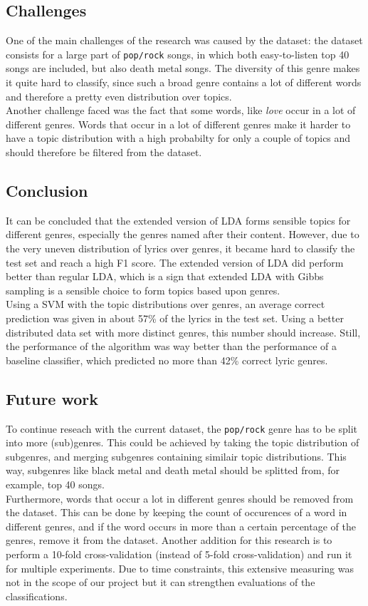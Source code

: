 \subsection{Challenges}
One of the main challenges of the research was caused by the dataset: the dataset consists for a large part of \verb|pop/rock| songs, in which both easy-to-listen top 40 songs are included, but also death metal songs. The diversity of this genre makes it quite hard to classify, since such a broad genre contains a lot of different words and therefore a pretty even distribution over topics. \\
Another challenge faced was the fact that some words, like \textit{love} occur in a lot of different genres. Words that occur in a lot of different genres make it harder to have a topic distribution with a high probabilty for only a couple of topics and should therefore be filtered from the dataset. 

\subsection{Conclusion}
It can be concluded that the extended version of LDA forms sensible topics for different genres, especially the genres named after their content. However, due to the very uneven distribution of lyrics over genres, it became hard to classify the test set and reach a high F1 score. The extended version of LDA did perform better than regular LDA, which is a sign that extended LDA with Gibbs sampling is a sensible choice to form topics based upon genres. \\
Using a SVM with the topic distributions over genres, an average correct prediction was given in about 57\% of the lyrics in the test set. Using a better distributed data set with more distinct genres, this number should increase. Still, the performance of the algorithm was way better than the performance of a baseline classifier, which predicted no more than 42\% correct lyric genres.

\subsection{Future work}
To continue reseach with the current dataset, the \verb|pop/rock| genre has to be split into more (sub)genres. This could be achieved by taking the topic distribution of subgenres, and merging subgenres containing similair topic distributions. This way, subgenres like black metal and death metal should be splitted from, for example, top 40 songs. \\
Furthermore, words that occur a lot in different genres should be removed from the dataset. This can be done by keeping the count of occurences of a word in different genres, and if the word occurs in more than a certain percentage of the genres, remove it from the dataset.
Another addition for this research is to perform a 10-fold cross-validation (instead of 5-fold cross-validation) and run it for multiple experiments. Due to time constraints, this extensive measuring was not in the scope of our project but it can strengthen evaluations of the classifications.